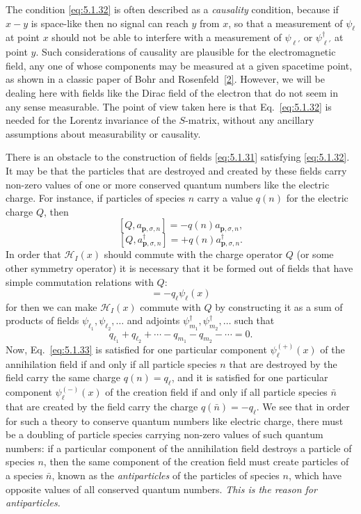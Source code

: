 The condition \eqref{eq:5.1.32} is often described as a \textit{causality} condition,
because if $x-y$ is space-like then no signal can reach $y$ from $x$, so that a
measurement of $\psi_\ell$ at point $x$ should not be able to interfere with a
measurement of $\psi_{\ell'}$ or $\psi^\dagger_{\ell'}$ at point $y$. Such
considerations of causality are plausible for the electromagnetic field, any
one of whose components may be measured at a given spacetime point, as shown
in a classic paper of Bohr and Rosenfeld~\hyperref[ref:5.2]{[2]}. However, we will be dealing here
with fields like the Dirac field of the electron that do not seem in any sense
measurable. The point of view taken here is that Eq.~\eqref{eq:5.1.32} is needed for the
Lorentz invariance of the $S$-matrix, without any ancillary assumptions about
measurability or causality.

There is an obstacle to the construction of fields \eqref{eq:5.1.31} satisfying
\eqref{eq:5.1.32}. It may be that the particles that are destroyed and created by
these fields carry non-zero values of one or more conserved quantum numbers
like the electric charge. For instance, if particles of species $n$ carry a
value $q(n)$ for the electric charge $Q$, then
\[
  [Q,a_{\mathbf{p},\sigma,n}]=-q(n)a_{\mathbf{p},\sigma,n},
\]
\[
  [Q,a^\dagger_{\mathbf{p},\sigma,n}]=+q(n)a^\dagger_{\mathbf{p},\sigma,n}.
\]
In order that $\mathcal{H}_I(x)$ should commute with the charge operator $Q$
(or some other symmetry operator) it is necessary that it be formed out of
fields that have simple commutation relations with $Q$:
\begin{equation}
  [Q,\psi_\ell(x)]=-q_\ell\psi_\ell(x)
  \tag{5.1.33}\label{eq:5.1.33}
\end{equation}
for then we can make $\mathcal{H}_I(x)$ commute with $Q$ by constructing it as
a sum of products of fields $\psi_{\ell_1},\psi_{\ell_2},\ldots$ and adjoints
$\psi^\dagger_{m_1},\psi^\dagger_{m_2},\ldots$ such that
\[
  q_{\ell_1}+q_{\ell_2}+\cdots-q_{m_1}-q_{m_2}-\cdots=0.
\]
Now, Eq.~\eqref{eq:5.1.33} is satisfied for one particular component
$\psi^{(+)}_\ell(x)$ of the annihilation field if and only if all particle
species $n$ that are destroyed by the field carry the same charge
$q(n)=q_\ell$, and it is satisfied for one particular component
$\psi^{(-)}_\ell(x)$ of the creation field if and only if all particle species
$\bar n$ that are created by the field carry the charge $q(\bar n)=-q_\ell$.
We see that in order for such a theory to conserve quantum numbers like
electric charge, there must be a doubling of particle species carrying
non-zero values of such quantum numbers: if a particular component of the
annihilation field destroys a particle of species $n$, then the same component
of the creation field must create particles of a species $\bar n$, known as the
\textit{antiparticles} of the particles of species $n$, which have opposite
values of all conserved quantum numbers. \textit{This is the reason for
antiparticles.}

